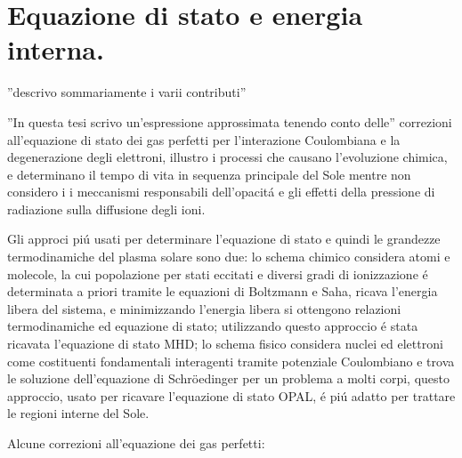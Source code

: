 \documentclass[../main.tex]{subfiles}
\begin{document}
\section{Equazione di stato e energia interna.}


\begingroup
\color{grey}

''descrivo sommariamente i varii contributi''

''In questa tesi scrivo un'espressione approssimata tenendo conto delle'' correzioni all'equazione di stato dei gas perfetti per l'interazione Coulombiana e la degenerazione degli elettroni, illustro i processi che causano l'evoluzione chimica, e determinano il tempo di vita in sequenza principale del Sole mentre non considero i i meccanismi responsabili dell'opacit\'a e gli effetti della pressione di radiazione sulla diffusione degli ioni.

\endgroup

Gli approci pi\'u usati per determinare l'equazione di stato e quindi le grandezze termodinamiche del plasma solare sono due: lo schema chimico considera atomi e molecole, la cui popolazione per stati eccitati e diversi gradi di ionizzazione \'e determinata a priori tramite le equazioni di Boltzmann e Saha, ricava l'energia libera del sistema, e minimizzando l'energia libera si ottengono relazioni termodinamiche ed equazione di stato; utilizzando questo approccio \'e stata ricavata l'equazione di stato MHD; lo schema fisico considera nuclei ed elettroni come costituenti fondamentali interagenti tramite potenziale Coulombiano e trova le soluzione dell'equazione di Schr\"oedinger per un problema a molti corpi, questo approccio, usato per ricavare l'equazione di stato OPAL, \'e pi\'u adatto per trattare le regioni interne del Sole.



Alcune correzioni all'equazione dei gas perfetti:
\end{document}
